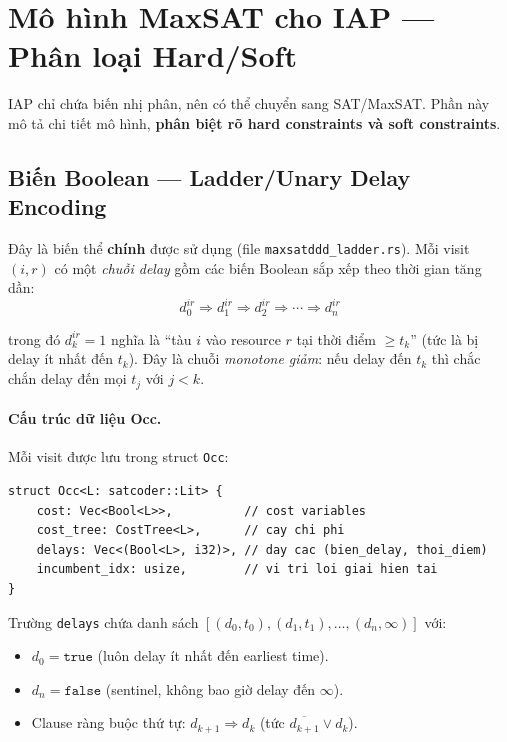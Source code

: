 \documentclass[11pt,a4paper]{article}
\begin{document}
\section{Mô hình MaxSAT cho IAP --- Phân loại Hard/Soft}
\label{sec:maxsat}

IAP chỉ chứa biến nhị phân, nên có thể chuyển sang SAT/MaxSAT. Phần này mô tả chi tiết mô hình, \textbf{phân biệt rõ hard constraints và soft constraints}.

\subsection{Biến Boolean --- Ladder/Unary Delay Encoding}
\label{sec:ladder}

Đây là biến thể \textbf{chính} được sử dụng (file \texttt{maxsatddd\_ladder.rs}). Mỗi visit $(i,r)$ có một \emph{chuỗi delay} gồm các biến Boolean sắp xếp theo thời gian tăng dần:
\[
d_0^{ir} \Rightarrow d_1^{ir} \Rightarrow d_2^{ir} \Rightarrow \cdots \Rightarrow d_{n}^{ir}
\]

trong đó $d_k^{ir} = 1$ nghĩa là ``tàu $i$ vào resource $r$ tại thời điểm $\geq t_k$'' (tức là bị delay ít nhất đến $t_k$). Đây là chuỗi \emph{monotone giảm}: nếu delay đến $t_k$ thì chắc chắn delay đến mọi $t_j$ với $j < k$.

\paragraph{Cấu trúc dữ liệu Occ.} Mỗi visit được lưu trong struct \texttt{Occ}:
\begin{verbatim}
struct Occ<L: satcoder::Lit> {
    cost: Vec<Bool<L>>,          // cost variables
    cost_tree: CostTree<L>,      // cay chi phi
    delays: Vec<(Bool<L>, i32)>, // day cac (bien_delay, thoi_diem)
    incumbent_idx: usize,        // vi tri loi giai hien tai
}
\end{verbatim}

Trường \texttt{delays} chứa danh sách $[(d_0, t_0), (d_1, t_1), \ldots, (d_n, \infty)]$ với:
\begin{itemize}
  \item $d_0 = \texttt{true}$ (luôn delay ít nhất đến earliest time).
  \item $d_n = \texttt{false}$ (sentinel, không bao giờ delay đến $\infty$).
  \item Clause ràng buộc thứ tự: $d_{k+1} \Rightarrow d_k$ (tức $\overline{d_{k+1}} \vee d_k$).
\end{itemize}
\end{document}
